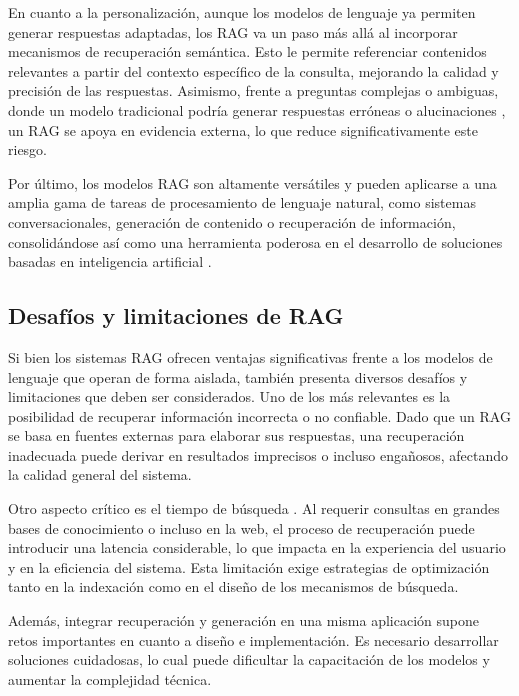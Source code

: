              \noindent En cuanto a la personalización, aunque los modelos de lenguaje ya permiten generar respuestas adaptadas, los RAG va un paso más allá al incorporar mecanismos de recuperación semántica. Esto le permite referenciar contenidos relevantes a partir del contexto específico de la consulta, mejorando la calidad y precisión de las respuestas. Asimismo, frente a preguntas complejas o ambiguas, donde un modelo tradicional podría generar respuestas erróneas o alucinaciones \cite{0002_LLMhallu}, un RAG se apoya en evidencia externa, lo que reduce significativamente este riesgo.
                    
            \noindent Por último, los modelos RAG son altamente versátiles y pueden aplicarse a una amplia gama de tareas de procesamiento de lenguaje natural, como sistemas conversacionales, generación de contenido o recuperación de información, consolidándose así como una herramienta poderosa en el desarrollo de soluciones basadas en inteligencia artificial \cite{0003_RAGhowitwork2}.
        
        \subsection{Desafíos y limitaciones de RAG}
        
            Si bien los sistemas RAG ofrecen ventajas significativas frente a los modelos de lenguaje que operan de forma aislada, también presenta diversos desafíos y limitaciones que deben ser considerados. Uno de los más relevantes es la posibilidad de recuperar información incorrecta o no confiable. Dado que un RAG se basa en fuentes externas para elaborar sus respuestas, una recuperación inadecuada puede derivar en resultados imprecisos o incluso engañosos, afectando la calidad general del sistema.
                    
            \noindent Otro aspecto crítico es el tiempo de búsqueda \cite{0003_RAGhowitwork2}. Al requerir consultas en grandes bases de conocimiento o incluso en la web, el proceso de recuperación puede introducir una latencia considerable, lo que impacta en la experiencia del usuario y en la eficiencia del sistema. Esta limitación exige estrategias de optimización tanto en la indexación como en el diseño de los mecanismos de búsqueda.
                    
            \noindent Además, integrar recuperación y generación en una misma aplicación supone retos importantes en cuanto a diseño e implementación. Es necesario desarrollar soluciones cuidadosas, lo cual puede dificultar la capacitación de los modelos y aumentar la complejidad técnica.
                    
